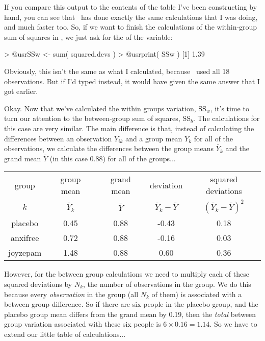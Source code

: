 If you compare this output to the contents of the table I've been constructing by hand, you can see that \R\ has done exactly the same calculations that I was doing, and much faster too. So, if we want to finish the calculations of the within-group sum of squares in \R, we just ask for the  of the  variable:
\begin{rblock1}
> @usr{SSw <- sum( squared.devs )}
> @usr{print( SSw )}
[1] 1.39
\end{rblock1}
Obviously, this isn't the same as what I calculated, because \R\ used all 18 observations. But if I'd typed  instead, it would have given the same answer that I got earlier.

Okay. Now that we've calculated the within groups variation, $\mbox{SS}_w$, it's time to turn our attention to the between-group sum of squares, $\mbox{SS}_b$. The calculations for this case are very similar. The main difference is that, instead of calculating the differences between an observation $Y_{ik}$ and a group mean $\bar{Y}_k$ for all of the observations, we calculate the differences between the group means $\bar{Y}_k$ and the grand mean $\bar{Y}$ (in this case 0.88) for all of the groups...

\small
\vspace*{6pt}
\begin{tabular}{c|c|c|c|c}
 group & group mean  & grand mean & deviation               & squared deviations \\  
  $k$  & $\bar{Y}_k$ & $\bar{Y}$  & $\bar{Y}_{k} - \bar{Y}$ & $(\bar{Y}_{k} - \bar{Y})^2$ \\  \hline
placebo   & 0.45  &  0.88 &  -0.43 &  0.18 \\
anxifree  & 0.72  &  0.88 &  -0.16 &  0.03 \\
joyzepam  & 1.48  &  0.88 &  0.60  &  0.36 \\
\end{tabular}
\vspace*{6pt}
\normalsize

\noindent
However, for the between group calculations we need to multiply each of these squared deviations by $N_k$, the number of observations in the group. We do this because every {\it observation} in the group (all $N_k$ of them) is associated with a between group difference. So if there are six people in the placebo group, and the placebo group mean differs from the grand mean by 0.19, then the {\it total} between group variation associated with these six people is $6 \times 0.16 = 1.14$. So we have to extend our little table of calculations...

